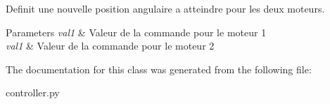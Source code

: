 Definit une nouvelle position angulaire a atteindre pour les deux moteurs. 


\begin{DoxyParams}{Parameters}
{\em val1} & Valeur de la commande pour le moteur 1 \\
\hline
{\em val1} & Valeur de la commande pour le moteur 2 \\
\hline
\end{DoxyParams}


The documentation for this class was generated from the following file\+:\begin{DoxyCompactItemize}
\item 
controller.\+py\end{DoxyCompactItemize}
